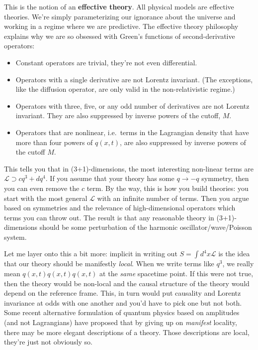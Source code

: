 This is the notion of an \textbf{effective theory}. All physical models are effective theories. We're simply parameterizing our ignorance about the universe and working in a regime where we are predictive. The effective theory philosophy explains why we are so obsessed with Green's functions of second-derivative operators:
\begin{itemize}
	\item Constant operators are trivial, they're not even differential.
	\item Operators with a single derivative are not Lorentz invariant. (The exceptions, like the diffusion operator, are only valid in the non-relativistic regime.)
	\item Operators with three, five, or any odd number of derivatives are not Lorentz invariant. They are also suppressed by inverse powers of the cutoff, $M$.
	\item Operators that are nonlinear, i.e.~terms in the Lagrangian density that have more than four powers of $q(x,t)$, are also suppressed by inverse powers of the cutoff $M$.
\end{itemize}
This tells you that in (3+1)-dimensions, the most interesting non-linear terms are $\mathcal L \supset cq^3+ dq^4$. If you assume that your theory has some $q\to -q$ symmetry, then you can even remove the $c$ term. By the way, this is how you build theories: you start with the most general $\mathcal L$ with an infinite number of terms. Then you argue based on symmetries and the relevance of high-dimensional operators which terms you can throw out. The result is that any reasonable theory in (3+1)-dimensions should be some perturbation of the harmonic oscillator/wave/Poisson system.

Let me layer onto this a bit more: implicit in writing out $S=\int d^4x\mathcal L$ is the idea that our theory should be manifestly \emph{local}. When we write terms like $q^3$, we really mean $q(x,t)q(x,t)q(x,t)$ at the \emph{same} spacetime point. If this were not true, then the theory would be non-local and the causal structure of the theory would depend on the reference frame. This, in turn would put causality and Lorentz invariance at odds with one another and you'd have to pick one but not both. Some recent alternative formulation of quantum physics based on amplitudes (and not Lagrangians) have proposed that by giving up on \emph{manifest} locality, there may be more elegant descriptions of a theory. Those descriptions are local, they're just not obviously so.
















